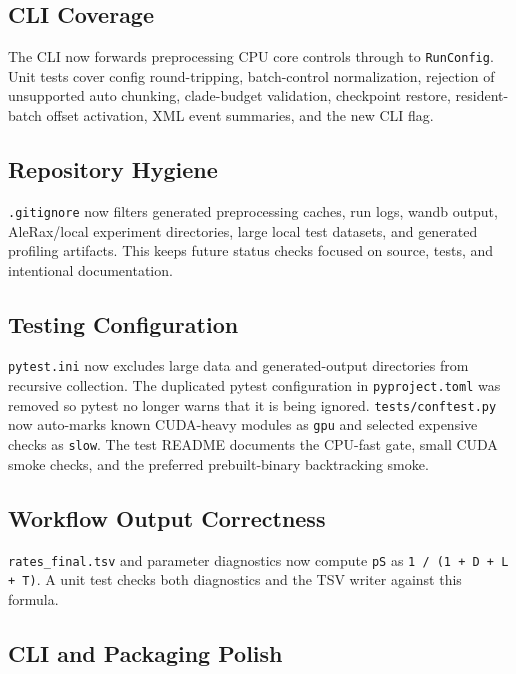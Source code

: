 \documentclass[11pt]{article}
\begin{document}
\subsection{CLI Coverage}

The CLI now forwards preprocessing CPU core controls through to
\texttt{RunConfig}.  Unit tests cover config round-tripping, batch-control
normalization, rejection of unsupported auto chunking, clade-budget validation,
checkpoint restore, resident-batch offset activation, XML event summaries, and
the new CLI flag.

\subsection{Repository Hygiene}

\texttt{.gitignore} now filters generated preprocessing caches, run logs,
wandb output, AleRax/local experiment directories, large local test datasets,
and generated profiling artifacts.  This keeps future status checks focused on
source, tests, and intentional documentation.

\subsection{Testing Configuration}

\texttt{pytest.ini} now excludes large data and generated-output directories
from recursive collection.  The duplicated pytest configuration in
\texttt{pyproject.toml} was removed so pytest no longer warns that it is being
ignored.  \texttt{tests/conftest.py} now auto-marks known CUDA-heavy modules as
\texttt{gpu} and selected expensive checks as \texttt{slow}.  The test README
documents the CPU-fast gate, small CUDA smoke checks, and the preferred
prebuilt-binary backtracking smoke.

\subsection{Workflow Output Correctness}

\texttt{rates\_final.tsv} and parameter diagnostics now compute \texttt{pS} as
\texttt{1 / (1 + D + L + T)}.  A unit test checks both diagnostics and the TSV
writer against this formula.

\subsection{CLI and Packaging Polish}
\end{document}
